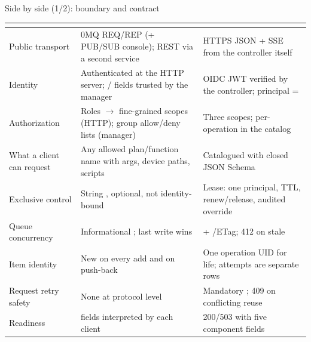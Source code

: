 
\begin{frame}{Side by side (1/2): boundary and contract}
    \footnotesize
    \renewcommand{\arraystretch}{1.35}
    \begin{tabular}{@{}L{2.7cm}L{5.4cm}L{5.4cm}@{}}
        \toprule
        & \textbf{\color{qsamber}\legacy{}} & \textbf{\color{qsnavy}\vtwo{}} \\
        \midrule
        Public transport & 0MQ REQ/REP (+ PUB/SUB console); REST via a second service & HTTPS JSON + SSE from the controller itself \\
        Identity & Authenticated at the HTTP server; / fields trusted by the manager & OIDC JWT verified by the controller; principal =  \\
        Authorization & Roles $\to$ fine-grained scopes (HTTP); group allow/deny lists (manager) & Three scopes; per-operation  in the catalog \\
        What a client can request & Any allowed plan/function name with args, device paths, scripts & Catalogued  with closed JSON Schema \\
        Exclusive control & String , optional, not identity-bound & Lease: one principal, TTL, renew/release, audited override \\
        Queue concurrency & Informational ; last write wins &  + /ETag; 412 on stale \\
        Item identity & New  on every add and on push-back & One operation UID for life; attempts are separate rows \\
        Request retry safety & None at protocol level & Mandatory ; 409 on conflicting reuse \\
        Readiness &  fields interpreted by each client &  200/503 with five component fields \\
        \bottomrule
    \end{tabular}
\end{frame}

